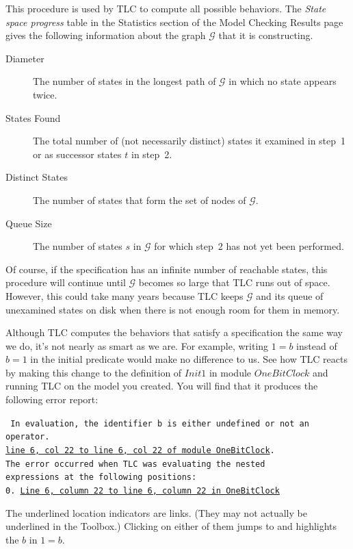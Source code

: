 \medskip

This procedure is used by TLC to compute all possible behaviors.  The
\emph{State space progress} table in the \textsf{Statistics} section
of the \textsf{Model Checking Results} page gives the following
information about the graph $\mathcal{G}$ that it is constructing.
\begin{description}
\item[Diameter] The number of states in the longest path of
                $\mathcal{G}$ in which no state appears twice.
\item[States Found] The total number of (not necessarily distinct)
states it examined in step~1 or as successor states $t$ in step~2.

\item[Distinct States] The number of states that form the set of nodes
of $\mathcal{G}$.

\item[Queue Size] The number of states $s$ in $\mathcal{G}$ for which
step~2 has not yet been performed.
\end{description}
Of course, if the specification has an infinite number of reachable
states, this procedure will continue until $\mathcal{G}$ becomes so
large that TLC runs out of space.  However, this could take many years
because TLC keeps $\mathcal{G}$ and its queue of unexamined states on
disk when there is not enough room for them in memory.

Although TLC computes the behaviors that satisfy a specification the
same way we do, it's not nearly as smart as we are.  For example,
writing $1=b$ instead of $b=1$ in the initial predicate would make no
difference to us.  See how TLC reacts by making this change to the
definition of $Init1$ in module $OneBitClock$ and running TLC on the
model you created.  You will find that it produces the following error
report:
\begin{widedisplay} \tt
In evaluation, the identifier b is either undefined or not an operator.\\
{\darkaqua\underline{line 6, col 22 to line 6, col 22 of module OneBitClock}}.\\
The error occurred when TLC was evaluating the nested\\
expressions at the following positions:\\
0. {\darkaqua\underline{Line 6, column 22 to line 6, column 22 in OneBitClock}}
\end{widedisplay}
The underlined location indicators are links.  (They may not actually be
underlined in the Toolbox.)  Clicking on either of them jumps
to and highlights the $b$ in $1=b$.

